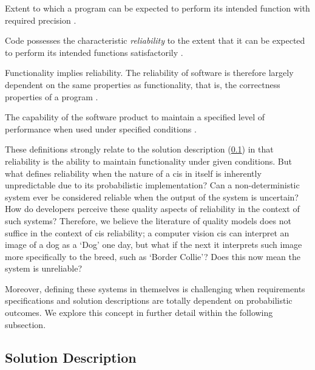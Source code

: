 \begin{description}[font=\itshape,style=multiline,leftmargin=3cm]
  \item[\citeauthor{McCall:1977uy}] Extent to which a program can be expected to perform its intended function with required precision \citep{McCall:1977uy}.
  \item[\citeauthor{Boehm:1978vv}] Code possesses the characteristic \textit{reliability} to the extent that it can be expected to perform its intended functions satisfactorily \citep{Boehm:1978vv}.
  \item[\citeauthor{Dromey:1995wy}] Functionality implies reliability. The reliability of software is therefore largely dependent on the same properties as functionality, that is, the correctness properties of a program \citep{Dromey:1995wy}.
  \item[ISO/IEC-9126] The capability of the software product to maintain a specified level of performance when used under specified conditions \citep{ISO9126:1999}.
\end{description}

These definitions strongly relate to the solution description (\cref{ssec:background:software-quality:solution-description}) in that reliability is the ability to maintain functionality under given conditions. But what defines reliability when the nature of a \gls{cis} in itself is inherently unpredictable due to its probabilistic implementation? Can a non-deterministic system ever be considered reliable when the output of the system is uncertain? How do developers perceive these quality aspects of reliability in the context of such systems? Therefore, we believe the literature of quality models does not suffice in the context of \gls{cis} reliability; a computer vision \gls{cis} can interpret an image of a dog as a `Dog' one day, but what if the next it interprets such image more specifically to the breed, such as `Border Collie'? Does this now mean the system is unreliable? 

Moreover, defining these systems in themselves is challenging when requirements specifications and solution descriptions are totally dependent on probabilistic outcomes. We explore this concept in further detail within the following subsection.

\subsection{Solution Description}
\label{ssec:background:software-quality:solution-description}